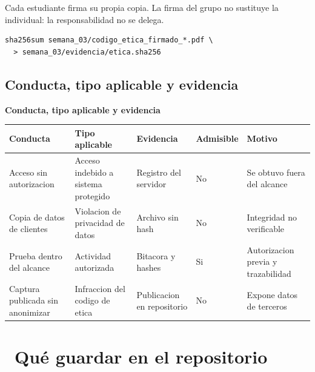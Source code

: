 \documentclass[11pt,a4paper]{article}
\newcommand{\iconotexto}[2]{\textcolor{cyanNeon}{\faIcon{#1}}~#2}
\begin{document}
Cada estudiante firma su propia copia. La firma del grupo no sustituye la individual: la responsabilidad no se delega.

\begin{lstlisting}[style=estiloCodigo]
sha256sum semana_03/codigo_etica_firmado_*.pdf \
  > semana_03/evidencia/etica.sha256
\end{lstlisting}

\subsection{Conducta, tipo aplicable y evidencia}

\begin{center}
\begin{minipage}{\linewidth}
\centering
{\footnotesize
\textbf{Conducta, tipo aplicable y evidencia}\par\smallskip
\begin{tabular}{@{}>{\raggedright\arraybackslash}p{3.20cm}>{\raggedright\arraybackslash}p{3.00cm}>{\raggedright\arraybackslash}p{2.60cm}>{\raggedright\arraybackslash}p{1.60cm}>{\raggedright\arraybackslash}p{3.60cm}@{}}
\toprule
\textbf{Conducta} & \textbf{Tipo aplicable} & \textbf{Evidencia} & \textbf{Admisible} & \textbf{Motivo} \\
\midrule
Acceso sin autorizacion & Acceso indebido a sistema protegido & Registro del servidor & No & Se obtuvo fuera del alcance \\
Copia de datos de clientes & Violacion de privacidad de datos & Archivo sin hash & No & Integridad no verificable \\
Prueba dentro del alcance & Actividad autorizada & Bitacora y hashes & Si & Autorizacion previa y trazabilidad \\
Captura publicada sin anonimizar & Infraccion del codigo de etica & Publicacion en repositorio & No & Expone datos de terceros \\
\bottomrule
\end{tabular}
}
\par{}
\end{minipage}
\end{center}

\section{\iconotexto{box-open}{Qué guardar en el repositorio}}
\end{document}

